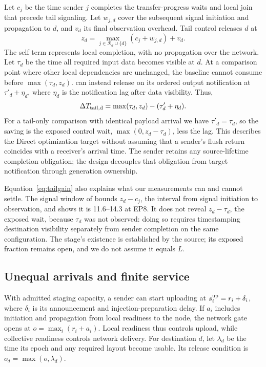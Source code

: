 Let $c_j$ be the time sender $j$ completes the transfer-progress waits and local join that precede tail signaling. Let $w_{j,d}$ cover the subsequent signal initiation and propagation to $d$, and $v_d$ its final observation overhead. Tail control releases $d$ at
\begin{equation}
 z_d=\max_{j\in\mathcal{R}_d\cup\{d\}}(c_j+w_{j,d})+v_d.
 \label{eq:tailsignal}
\end{equation}
The self term represents local completion, with no propagation over the network. Let $\tau_d$ be the time all required input data becomes visible at $d$. At a comparison point where other local dependencies are unchanged, the baseline cannot consume before $\max(\tau_d,z_d)$. \sys{} can instead release on its ordered output notification at $\tau'_d+\eta_d$, where $\eta_d$ is the notification lag after data visibility. Thus,
\begin{equation}
 \Delta T_{\rm tail,d}=\max(\tau_d,z_d)-(\tau'_d+\eta_d).
 \label{eq:tailgain}
\end{equation}
For a tail-only comparison with identical payload arrival we have $\tau'_d=\tau_d$, so
the saving is the exposed control wait, $\max(0,z_d-\tau_d)$, less the lag. This
describes the Direct optimization target without assuming that a sender's flush return
coincides with a receiver's arrival time. The sender retains any source-lifetime
completion obligation; the design decouples that obligation from target notification
through generation ownership.

Equation~\eqref{eq:tailgain} also explains what our measurements can and cannot settle.
The signal window of  bounds $z_d - c_j$, the interval from signal
initiation to observation, and shows it is 11.6--14.3\us{} at EP8. It does not reveal
$z_d - \tau_d$, the exposed wait, because $\tau_d$ was not observed: doing so requires
timestamping destination visibility separately from sender completion on the same
configuration. The stage's existence is established by the source; its exposed fraction
remains open, and we do not assume it equals $L$.

\subsection{Unequal arrivals and finite service}
\label{sec:skew}
With admitted staging capacity, a \sys{} sender can start uploading at $s_i^{\rm up}=r_i+\delta_i$, where $\delta_i$ is its announcement and injection-preparation delay. If $a_i$ includes \ready{} initiation and propagation from local readiness to the \sys{} node, the network gate opens at $o=\max_i(r_i+a_i)$. Local readiness thus controls upload, while collective readiness controls network delivery. For destination $d$, let $\lambda_d$ be the time its epoch and any required layout become usable. Its release condition is $o_d=\max(o,\lambda_d)$.

